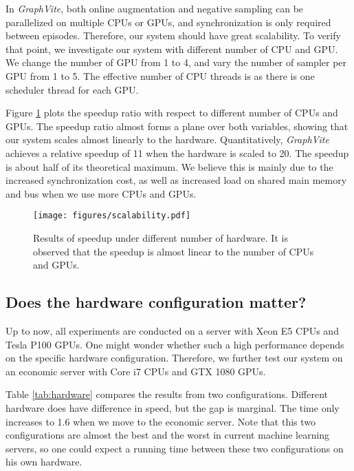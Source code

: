 \documentclass[sigconf]{acmart}
\newcommand{\Graphy}{\textit{GraphVite}\xspace}
\begin{document}
In \Graphy, both online augmentation and negative sampling can be parallelized on multiple CPUs or GPUs, and synchronization is only required between episodes. Therefore, our system should have great scalability. To verify that point, we investigate our system with different 
number of CPU and GPU. We change the number of GPU from 1 to 4, and vary the number of sampler per GPU from 1 to 5. The effective number of CPU threads is  as there is one scheduler thread for each GPU.

Figure \ref{fig:scalability} plots the speedup ratio with respect to different number of CPUs and GPUs. The speedup ratio almost forms a plane over both variables, showing that our system scales almost linearly to the hardware. Quantitatively, \Graphy achieves a relative speedup of 11 when the hardware is scaled to 20. The speedup is about half of its theoretical maximum. We believe this is mainly due to the increased synchronization cost, as well as increased load on shared main memory and bus when we use more CPUs and GPUs.

\begin{figure}[!h]
    \centering
    \texttt{[image: figures/scalability.pdf]}
    \caption{Results of speedup under different number of hardware. It is observed that the speedup is almost linear to the number of CPUs and GPUs.}
    \label{fig:scalability}
\end{figure}

\subsection{Does the hardware configuration matter?}

Up to now, all experiments are conducted on a server with Xeon E5 CPUs and Tesla P100 GPUs. One might wonder whether such a high performance depends on the specific hardware configuration. Therefore, we further test our system on an economic server with Core i7 CPUs and GTX 1080 GPUs.

Table \ref{tab:hardware} compares the results from two configurations. Different hardware does have difference in speed, but the gap is marginal. The time only increases to 1.6 when we move to the economic server. Note that this two configurations are almost the best and the worst in current machine learning servers, so one could expect a running time between these two configurations on his own hardware.
\end{document}

